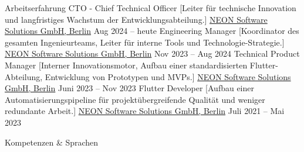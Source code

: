 \documentclass[
]{../llresume}
\begin{document}
\begin{mainpane}
    \begin{mainsection}{Arbeitserfahrung}
        \entryJob
            {CTO - Chief Technical Officer}
            [Leiter für technische Innovation und langfristiges Wachstum der Entwicklungsabteilung.]
            {\href{https://www.neon.dev/}{NEON Software Solutions GmbH, Berlin}}
            {Aug 2024 -- heute}
        \entryJob
            {Engineering Manager}
            [Koordinator des gesamten Ingenieurteams, Leiter für interne Tools und Technologie-Strategie.]
            {\href{https://www.neon.dev/}{NEON Software Solutions GmbH, Berlin}}
            {Nov 2023 -- Aug 2024}
        \entryJob
            {Technical Product Manager}
            [Interner Innovationsmotor, Aufbau einer standardisierten Flutter-Abteilung, Entwicklung von Prototypen und MVPs.]
            {\href{https://www.neon.dev/}{NEON Software Solutions GmbH, Berlin}}
            {Juni 2023 -- Nov 2023}
        \entryJob
            {Flutter Developer}
            [Aufbau einer Automatisierungspipeline für projektübergreifende Qualität und weniger redundante Arbeit.]
            {\href{https://www.neon.dev/}{NEON Software Solutions GmbH, Berlin}}
            {Juli 2021 -- Mai 2023}
    \end{mainsection}

    \begin{mainsection}{Kompetenzen \& Sprachen}
    \end{mainsection}
\end{mainpane}
\end{document}
